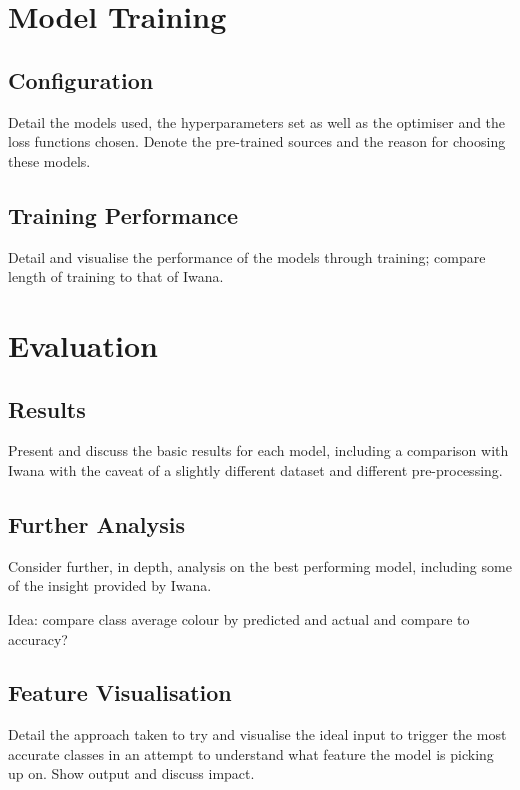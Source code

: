 \documentclass[12pt]{article}
\numberwithin{equation}{section}
\numberwithin{figure}{section}
\begin{document}
\section{Model Training} 
\label{sec:Model_Training} 
\subsection{Configuration} 
\label{sub:Configuration} 
Detail the models used, the hyperparameters set as well as the optimiser and the loss functions chosen. Denote the pre-trained sources and the reason for choosing these models.
\subsection{Training Performance} 
\label{sub:Training_Performance} 
Detail and visualise the performance of the models through training; compare length of training to that of Iwana.


\section{Evaluation} 
\label{sec:Evaluation_and_Further_Exploration} 
\subsection{Results} 
\label{sub:Results} 
Present and discuss the basic results for each model, including a comparison with Iwana with the caveat of a slightly different dataset and different pre-processing. 

\subsection{Further Analysis} 
\label{sub:Further_Analysis} 
Consider further, in depth, analysis on the best performing model, including some of the insight provided by Iwana.

Idea: compare class average colour by predicted and actual and compare to accuracy?
\subsection{Feature Visualisation} 
\label{sub:Feature_Visualisation} 
Detail the approach taken to try and visualise the ideal input to trigger the most accurate classes in an attempt to understand what feature the model is picking up on. Show output and discuss impact.
\end{document}
